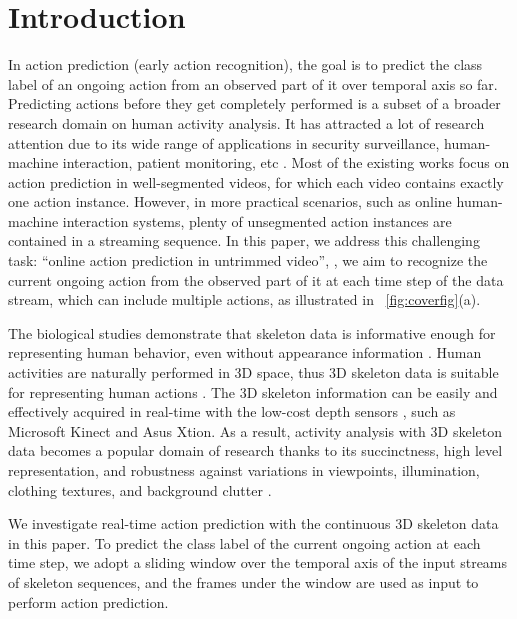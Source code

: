 \documentclass[10pt,twocolumn,letterpaper]{article}
\begin{document}
\section{Introduction}
\label{sec:introduction}
In action prediction (early action recognition), the goal is to predict the class label of an ongoing action from an observed part of it over temporal axis so far.
Predicting actions before they get completely performed is a subset of a broader research domain on human activity analysis.
It has attracted a lot of research attention due to its wide range of applications in
security surveillance, human-machine interaction, patient monitoring, etc \cite{hu2016real,cao2013recognize}.
Most of the existing works \cite{hu2016real,ke2016human,kongdeep2017} focus on action prediction in well-segmented videos, for which each video contains exactly one action instance.
However, in more practical scenarios, such as online human-machine interaction systems,
plenty of unsegmented action instances are contained in a streaming sequence.
In this paper, we address this challenging task: ``online action prediction in untrimmed video'',
\ie, we aim to recognize the current ongoing action from the observed part of it at each time step of the data stream,
which can include multiple actions, as illustrated in \figurename{~\ref{fig:coverfig}(a)}.

The biological studies \cite{johansson1973visual} demonstrate that skeleton data is informative enough for representing human behavior,
even without appearance information \cite{zhang2017view}.
Human activities are naturally performed in 3D space, thus 3D skeleton data is suitable for representing human actions \cite{mawalking2017}.
The 3D skeleton information can be easily and effectively acquired in real-time with the low-cost depth sensors \cite{han2013enhanced}, such as Microsoft Kinect and Asus Xtion. As a result, activity analysis with 3D skeleton data becomes a popular domain of research
\cite{han2017review,presti20163d,veeriah2015differential,liu2017PAMI,liu2017fusing,zhang2017geometric,liu2018TIP,rahmani2017learning,rahmani2014real}
thanks to its succinctness, high level representation,
and robustness against variations in viewpoints, illumination, clothing textures, and background clutter \cite{du2015hierarchical,liu2016eccv,hu2016real}.









We investigate real-time action prediction with the continuous 3D skeleton data in this paper.
To predict the class label of the current ongoing action at each time step,
we adopt a sliding window over the temporal axis of the input streams of skeleton sequences,
and the frames under the window are used as input to perform action prediction.
\end{document}
